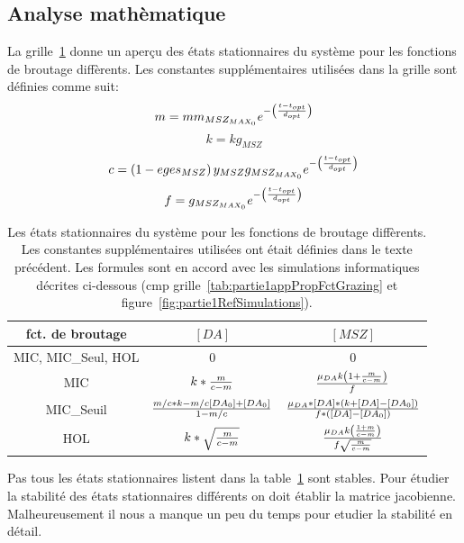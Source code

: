 {\subsection{Analyse mathèmatique}

\par{
La grille~\ref{tab:partie1etatsStat} donne un aperçu des états stationnaires du système
pour les fonctions de broutage diffèrents. Les constantes supplémentaires utilisées
dans la grille sont définies comme suit:
}
\[
m = mm_{MSZ_{MAX_0}} e ^{- \left ( {{t-t_{opt}}\over{d_{opt}}} \right )}
\]
\[
k = kg_{MSZ}
\]
\[
c = \left ( 1 - eges_{MSZ} \right ) y_{MSZ}
g_{MSZ_{MAX_0}} e ^{- \left ( {{t-t_{opt}}\over{d_{opt}}} \right )}
\]
\[
f = g_{MSZ_{MAX_0}} e ^{- \left ( {{t-t_{opt}}\over{d_{opt}}} \right )}
\]

\begin{table}[h!]
\begin{center}
\begin{tabular}{ | c | c c | }
\hline
fct. de broutage & $[DA]$ & $[MSZ]$ \\
\hline
MIC, MIC\_Seul, HOL & 0 & 0 \\
MIC & $k * {{m}\over{c-m}}$ & ${{\mu_{DA} k \left ( 1 + {{m}\over{c-m}} \right )}\over{f}}$ \\
MIC\_Seuil & ${{m/c*k-m/c[DA_0]+[DA_0]}\over{1-m/c}}$ & ${\mu_{DA} * [DA] * (k + [DA] - [DA_0])}\over{f *([DA] - [DA_0])}$ \\
HOL & $k*\sqrt{{{m}\over{c-m}}}$ & ${{\mu_{DA}k \left ( 1 + {m}\over{c-m} \right )}\over{f \sqrt{{m}\over{c-m}}}}$ \\
\hline
\end{tabular}
\end{center}
  \caption{Les états stationnaires du système pour les fonctions de broutage diffèrents. Les
constantes supplémentaires utilisées ont était définies dans le texte précédent. Les formules sont en accord
avec les simulations informatiques décrites ci-dessous (cmp grille~\ref{tab:partie1appPropFctGrazing} et
figure~\ref{fig:partie1RefSimulations}).
}
  \label{tab:partie1etatsStat}
\end{table}
\FloatBarrier

\par{
Pas tous les états stationnaires listent dans la table~\ref{tab:partie1etatsStat} sont stables. Pour
étudier la stabilité des états stationnaires différents on doit établir la matrice jacobienne.
Malheureusement il nous a manque un peu du temps pour etudier la stabilité en détail.
}

}
